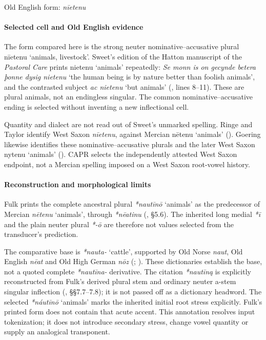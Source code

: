 \documentclass[
  british,
  a4paper,
]{article}
\providecommand{\Recon}[1]{\emph{*#1}}
\begin{document}
Old English form: \emph{nīetenu}

\paragraph{Selected cell and Old English
evidence}\label{selected-cell-and-old-english-evidence}

The form compared here is the strong neuter nominative--accusative
plural {nīetenu} `animals, livestock'. Sweet's edition of the Hatton
manuscript of the \emph{Pastoral Care} prints {nietenu} `animals'
repeatedly: \emph{Se monn is on gecynde betera þonne dysig nietenu} `the
human being is by nature better than foolish animals', and the
contrasted subject \emph{ac nietenu} `but animals'
(, lines 8--11). These are
plural animals, not an endingless singular. The common
nominative--accusative ending is selected without inventing a new
inflectional cell.

Quantity and dialect are not read out of Sweet's unmarked spelling.
Ringe and Taylor identify West Saxon \emph{nīetenu}, against Mercian
{nētenu} `animals' (). Goering likewise identifies these
nominative--accusative plurals and the later West Saxon {nytenu}
`animals' (). CAPR selects
the independently attested West Saxon endpoint, not a Mercian spelling
imposed on a West Saxon root-vowel history.

\paragraph{Reconstruction and morphological
limits}\label{reconstruction-and-morphological-limits}

Fulk prints the complete ancestral plural \Recon{nautīnō} `animals' as
the predecessor of Mercian \emph{nētenu} `animals', through
\emph{*nēatinu} (, §5.6). The
inherited long medial \emph{*ī} and the plain neuter plural \emph{*-ō}
are therefore not values selected from the transducer's prediction.

The comparative base is \emph{*nauta-} `cattle', supported by Old Norse
\emph{naut}, Old English \emph{nēat} and Old High German \emph{nōz}
(;
). These dictionaries establish
the base, not a quoted complete \emph{*nautīna-} derivative. The
citation \emph{*nautīną} is explicitly reconstructed from Fulk's derived
plural stem and ordinary neuter a-stem singular inflection
(, §§7.7--7.8); it is not
passed off as a dictionary headword. The selected \Recon{náutīnō}
`animals' marks the inherited initial root stress explicitly. Fulk's
printed form does not contain that acute accent. This annotation
resolves input tokenization; it does not introduce secondary stress,
change vowel quantity or supply an analogical transponent.
\end{document}

